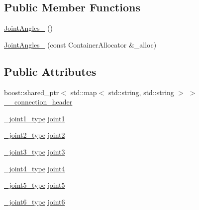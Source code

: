 \subsection*{Public Member Functions}
\begin{DoxyCompactItemize}
\item 
\hyperlink{structjaco__msgs_1_1JointAngles___a50a22b1f460bc39c40ef6771e8551e9c}{Joint\+Angles\+\_\+} ()
\item 
\hyperlink{structjaco__msgs_1_1JointAngles___aef102ac717e984bc88a8e0c27b1b3c6e}{Joint\+Angles\+\_\+} (const Container\+Allocator \&\+\_\+alloc)
\end{DoxyCompactItemize}
\subsection*{Public Attributes}
\begin{DoxyCompactItemize}
\item 
boost\+::shared\+\_\+ptr$<$ std\+::map$<$ std\+::string, std\+::string $>$ $>$ \hyperlink{structjaco__msgs_1_1JointAngles___ad654dc4172c053245e7b7db38a215604}{\+\_\+\+\_\+connection\+\_\+header}
\item 
\hyperlink{structjaco__msgs_1_1JointAngles___ad68900048ed8b91940a224d1c39a1b0d}{\+\_\+joint1\+\_\+type} \hyperlink{structjaco__msgs_1_1JointAngles___a5ebadd874f74af99d452dc42787489b7}{joint1}
\item 
\hyperlink{structjaco__msgs_1_1JointAngles___a7908a1dd9bd0a8b94bfaccdb54237faa}{\+\_\+joint2\+\_\+type} \hyperlink{structjaco__msgs_1_1JointAngles___ad7bfb312caeafc6b2cb1fc02c6a3e116}{joint2}
\item 
\hyperlink{structjaco__msgs_1_1JointAngles___a3ebebbb479a12b31cef37c2dee41d20b}{\+\_\+joint3\+\_\+type} \hyperlink{structjaco__msgs_1_1JointAngles___ae8e5d407b34f0a6acd368ec1a28df526}{joint3}
\item 
\hyperlink{structjaco__msgs_1_1JointAngles___a4d55cf2b8660d9ab7896de50664b9ee1}{\+\_\+joint4\+\_\+type} \hyperlink{structjaco__msgs_1_1JointAngles___accb31f45f3a313794a9cab57b8a9b952}{joint4}
\item 
\hyperlink{structjaco__msgs_1_1JointAngles___ab4d7a4bc19b5a6d132666a21273df1ae}{\+\_\+joint5\+\_\+type} \hyperlink{structjaco__msgs_1_1JointAngles___ad02e456e0b382b2bf59b4eeb93318921}{joint5}
\item 
\hyperlink{structjaco__msgs_1_1JointAngles___a298f6a826b48509fa922df955db3ac71}{\+\_\+joint6\+\_\+type} \hyperlink{structjaco__msgs_1_1JointAngles___a474d9f2a0e329ba6bd08c8fa265e9a50}{joint6}
\end{DoxyCompactItemize}


